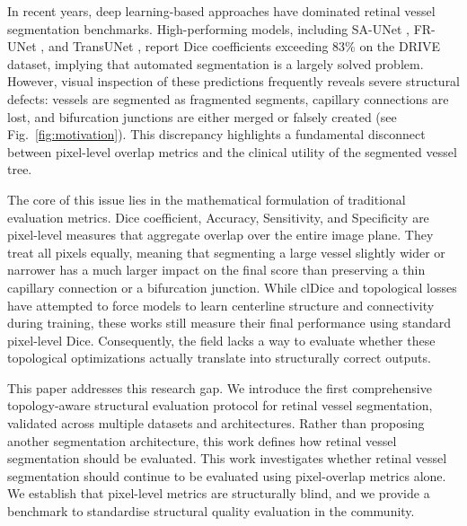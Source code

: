 \documentclass[conference]{IEEEtran}
\begin{document}
In recent years, deep learning-based approaches have dominated retinal vessel segmentation benchmarks. High-performing models, including SA-UNet \cite{wu2021sa-unet}, FR-UNet \cite{liu2022frunet}, and TransUNet \cite{chen2021transunet}, report Dice coefficients exceeding 83\% on the DRIVE dataset, implying that automated segmentation is a largely solved problem. However, visual inspection of these predictions frequently reveals severe structural defects: vessels are segmented as fragmented segments, capillary connections are lost, and bifurcation junctions are either merged or falsely created (see Fig.~\ref{fig:motivation}). This discrepancy highlights a fundamental disconnect between pixel-level overlap metrics and the clinical utility of the segmented vessel tree.

The core of this issue lies in the mathematical formulation of traditional evaluation metrics. Dice coefficient, Accuracy, Sensitivity, and Specificity are pixel-level measures that aggregate overlap over the entire image plane. They treat all pixels equally, meaning that segmenting a large vessel slightly wider or narrower has a much larger impact on the final score than preserving a thin capillary connection or a bifurcation junction. While clDice \cite{shit2021cldice} and topological losses \cite{clough2020topological, li2025topology} have attempted to force models to learn centerline structure and connectivity during training, these works still measure their final performance using standard pixel-level Dice. Consequently, the field lacks a way to evaluate whether these topological optimizations actually translate into structurally correct outputs.

This paper addresses this research gap. We introduce the first comprehensive topology-aware structural evaluation protocol for retinal vessel segmentation, validated across multiple datasets and architectures. Rather than proposing another segmentation architecture, this work defines how retinal vessel segmentation should be evaluated. This work investigates whether retinal vessel segmentation should continue to be evaluated using pixel-overlap metrics alone. We establish that pixel-level metrics are structurally blind, and we provide a benchmark to standardise structural quality evaluation in the community.
\end{document}
